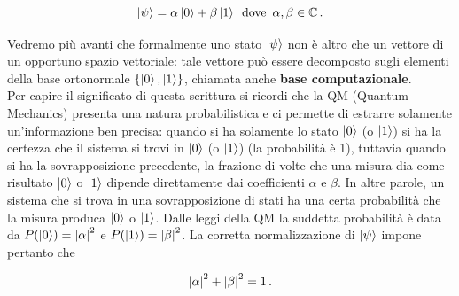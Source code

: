 \begin{equation*}
    \ket{\psi} = \alpha \ket{0} + \beta \ket{1} \, \text{ dove } \, \alpha, \beta \in \mathbb{C} \, .
\end{equation*}

\noindent Vedremo più avanti che formalmente uno stato $\ket{\psi}$ non è altro che un vettore di un opportuno spazio vettoriale: tale vettore può essere decomposto sugli elementi della base ortonormale $\left\lbrace \ket{0}, \ket{1} \right\rbrace$, chiamata anche \textbf{base computazionale}. \\
\noindent Per capire il significato di questa scrittura si ricordi che la QM (Quantum Mechanics) presenta una natura probabilistica e ci permette di estrarre solamente un'informazione ben precisa: quando si ha solamente lo stato $\ket{0}$ (o $\ket{1}$) si ha la certezza che il sistema si trovi in $\ket{0}$ (o $\ket{1}$) (la probabilità è 1), tuttavia quando si ha la sovrapposizione precedente, la frazione di volte che una misura dia come risultato $\ket{0}$ o $\ket{1}$ dipende direttamente dai coefficienti $\alpha$ e $\beta$. In altre parole, un sistema che si trova in una sovrapposizione di stati ha una certa probabilità che la misura produca $\ket{0}$ o $\ket{1}$. Dalle leggi della QM la suddetta probabilità è data da $P(\ket{0}) = \abs{\alpha}^2$ e $P(\ket{1}) = \abs{\beta}^2$. La corretta normalizzazione di $\ket{\psi}$ impone pertanto che

\begin{equation*}
    \abs{\alpha}^2 + \abs{\beta}^2 = 1 \, .
\end{equation*}

